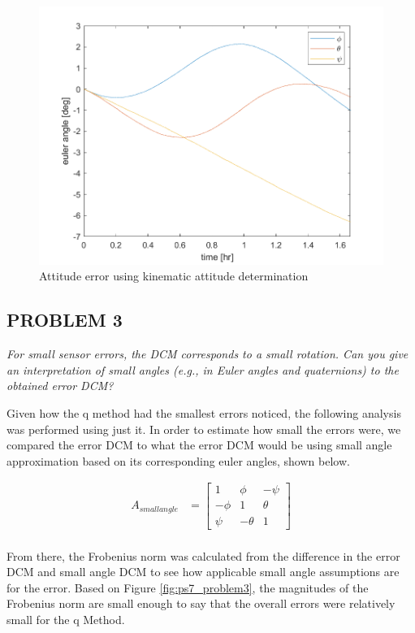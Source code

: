 \begin{figure}[H]
\centering
\includegraphics[scale=0.6]{Images/ps7_problem2_kin.png}
\caption{Attitude error using kinematic attitude determination}
\label{fig:ps7_problem2_kin}
\end{figure}

\subsection{PROBLEM 3}
\textit{For small sensor errors, the DCM corresponds to a small rotation. Can you give an interpretation of small angles (e.g., in Euler angles and quaternions) to the obtained error DCM?}

Given how the q method had the smallest errors noticed, the following analysis was performed using just it. In order to estimate how small the errors were, we compared the error DCM to what the error DCM would be using small angle approximation based on its corresponding euler angles, shown below.

\begin{align*}
    A_{small angle} &= 
    \begin{bmatrix}
        1 & \phi & -\psi \\
        -\phi & 1 & \theta \\
        \psi & -\theta & 1
    \end{bmatrix} \\
\end{align*}

From there, the Frobenius norm was calculated from the difference in the error DCM and small angle DCM to see how applicable small angle assumptions are for the error. Based on Figure \ref{fig:ps7_problem3}, the magnitudes of the Frobenius norm are small enough to say that the overall errors were relatively small for the q Method.


